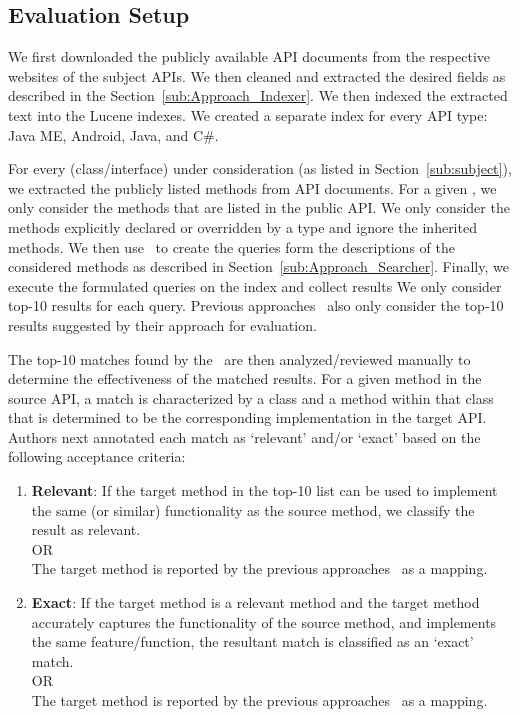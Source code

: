 \subsection{Evaluation Setup}


We first downloaded the publicly available API documents from the respective websites of the subject APIs. We then cleaned and extracted the desired fields as described in the Section~\ref{sub:Approach_Indexer}. We then indexed the extracted text into the Lucene indexes.
We created a separate index for every API type: Java ME, Android, Java, and C\#. 


For every  (class/interface) under consideration (as listed in Section~\ref{sub:subject}),
we extracted the publicly listed methods from API documents.
For a given , we only consider the methods that are listed in the public API.
We only consider the methods explicitly declared or overridden by a type and ignore the inherited methods.
We then use \tool\ to create the queries form the descriptions of the considered methods as described in Section~\ref{sub:Approach_Searcher}.
Finally, we execute the formulated queries on the index and collect results
We only consider top-10 results for each query.
Previous approaches~\cite{chatterjee2009sniff,Gokhale2013ICSE}
also only consider the top-10 results suggested by their approach for evaluation.



The top-10 matches found by the \tool\ are then analyzed/reviewed manually to determine the effectiveness of the matched results.
For a given method in the source API, a match is characterized by a class and a method within that class that is determined to be the corresponding implementation in the target API.
Authors next annotated each match as `relevant' and/or `exact' based on the following acceptance criteria:
\begin{enumerate}
	\item{\textbf{Relevant}}: If the target method in the top-10 list can be used to implement the same (or similar) functionality as the source method, we classify the result as relevant.\\
	OR\\
	The target method is reported by the previous approaches~\cite{Gokhale2013ICSE,nguyen2014statistical} as a mapping.

	\item{\textbf{Exact}}: If the target method is a relevant method and the target method accurately captures the functionality of the source method, and implements the same feature/function, the resultant match is classified as an `exact' match.\\
	OR\\
	The target method is reported by the previous approaches~\cite{Gokhale2013ICSE,nguyen2014statistical} as a mapping.
\end{enumerate}

